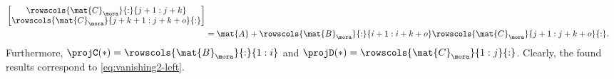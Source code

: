 \begin{example}
\begin{equation*}
\begin{aligned}
\begin{bmatrix}
                                                              \rowscols{\mat{C}_{\mora}}{:}{j+1:j+k} \\
                                                              \rowscols{\mat{C}_\mora}{j+k+1:j+k+o}{:}
                                                          \end{bmatrix} \\
                         & =\mat{A}+\rowscols{\mat{B}_\mora}{:}{i+1:i+k+o}\rowscols{\mat{C}_\mora}{j+1:j+k+o}{:}.
        \end{aligned}
    \end{equation*}
    Furthermore, $\projC(\ast) = \rowscols{\mat{B}_\mora}{:}{1:i}$ and $\projD(\ast) = \rowscols{\mat{C}_\mora}{1:j}{:}$.
    Clearly, the found results correspond to \cref{eq:vanishing2-left}.


\end{example}
